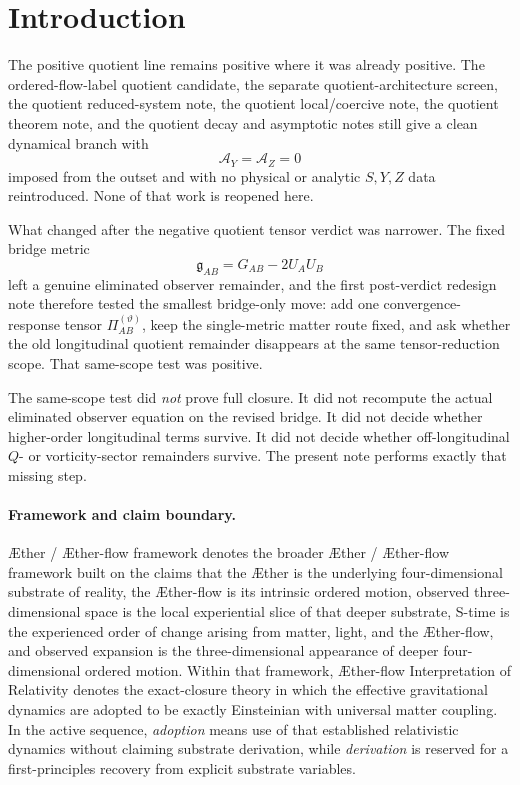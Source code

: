 \documentclass[11pt]{article}
\newcommand{\Aether}{\AE{}ther}
\newcommand{\Aflow}{\AE{}ther-flow}
\newcommand{\TheoryName}{\Aflow{} Interpretation of Relativity}
\newcommand{\TheoryProgram}{\Aether{} / \Aflow{} framework}
\newcommand{\BridgeMetric}{\mathfrak{g}}
\newcommand{\PiTheta}{\Pi^{(\vartheta)}}
\newcommand{\AY}{\mathcal A_Y}
\newcommand{\AZ}{\mathcal A_Z}
\begin{document}
\section{Introduction}

The positive quotient line remains positive where it was already positive. The ordered-flow-label quotient candidate, the separate quotient-architecture screen, the quotient reduced-system note, the quotient local/coercive note, the quotient theorem note, and the quotient decay and asymptotic notes still give a clean dynamical branch with
\[
\AY=\AZ=0
\]
imposed from the outset and with no physical or analytic \(S,Y,Z\) data reintroduced. None of that work is reopened here.

What changed after the negative quotient tensor verdict was narrower. The fixed bridge metric
\[
\BridgeMetric_{AB}=G_{AB}-2U_AU_B
\]
left a genuine eliminated observer remainder, and the first post-verdict redesign note therefore tested the smallest bridge-only move: add one convergence-response tensor \(\PiTheta_{AB}\), keep the single-metric matter route fixed, and ask whether the old longitudinal quotient remainder disappears at the same tensor-reduction scope. That same-scope test was positive.

The same-scope test did \emph{not} prove full closure. It did not recompute the actual eliminated observer equation on the revised bridge. It did not decide whether higher-order longitudinal terms survive. It did not decide whether off-longitudinal \(Q\)- or vorticity-sector remainders survive. The present note performs exactly that missing step.

\paragraph{Framework and claim boundary.}
\TheoryProgram{} denotes the broader \Aether{} / \Aflow{} framework built on the claims that the \Aether{} is the underlying four-dimensional substrate of reality, the \Aflow{} is its intrinsic ordered motion, observed three-dimensional space is the local experiential slice of that deeper substrate, S-time is the experienced order of change arising from matter, light, and the \Aflow{}, and observed expansion is the three-dimensional appearance of deeper four-dimensional ordered motion. Within that framework, \TheoryName{} denotes the exact-closure theory in which the effective gravitational dynamics are adopted to be exactly Einsteinian with universal matter coupling. In the active sequence, \emph{adoption} means use of that established relativistic dynamics without claiming substrate derivation, while \emph{derivation} is reserved for a first-principles recovery from explicit substrate variables.
\end{document}
